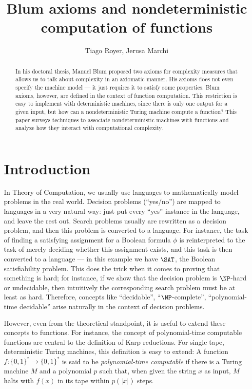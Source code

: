 \documentclass[12pt]{article}
\title{Blum axioms and nondeterministic computation of functions}
\author{Tiago Royer\inst{1}, Jerusa Marchi\inst{1}}
\theoremstyle{definition}
\begin{document}
\maketitle

\begin{abstract}
    In his doctoral thesis,
    Manuel Blum proposed two axioms for complexity measures
    that allows us to talk about complexity in an axiomatic manner.
    His axioms does not even specify the machine model
    --- it just requires it to satisfy some properties.
    Blum axioms, however,
    are defined in the context of function computation.
    This restriction is easy to implement with deterministic machines,
    since there is only one output for a given input,
    but how can a nondeterministic Turing machine compute a function?
    This paper surveys techniques to associate
    nondeterministic machines with functions
    and analyze how they interact with computational complexity.
\end{abstract}

\section{Introduction}

In Theory of Computation,
we usually use languages
to mathematically model problems in the real world.
Decision problems (``yes/no'') are mapped to languages in a very natural way:
just put every ``yes'' instance in the language,
and leave the rest out.
Search problems usually are rewritten as a decision problem,
and then this problem is converted to a language.
For instance,
the task of finding a satisfying assignment for a Boolean formula $\phi$
is reinterpreted to the task of merely deciding whether this assignment exists,
and this task is then converted to a language
--- in this example we have $\SAT$, the Boolean satisfiability problem.
This does the trick when it comes to proving that something is hard;
for instance, if we show that the decision problem is $\NP$-hard or undecidable,
then intuitively the corresponding search problem must be at least as hard.
Therefore,
concepts like ``decidable'', ``$\NP$-complete'', ``polynomial-time decidable''
arise naturally in the context of decision problems.

However, even from the theoretical standpoint,
it is useful to extend these concepts to functions.
For instance,
the concept of polynomial-time computable functions
are central to the definition of Karp reductions.
For single-tape, deterministic Turing machines,
this definition is easy to extend:
A function $f : \{0, 1\}^* \to \{0, 1\}^*$
is said to be \emph{polynomial-time computable}
if there is a Turing machine $M$ and a polynomial $p$ such that,
when given the string $x$ as input,
$M$ halts with $f(x)$ in its tape within $p(|x|)$ steps.
\end{document}
